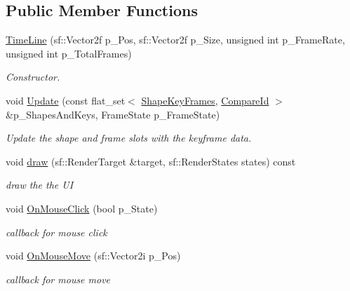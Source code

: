 \subsection*{Public Member Functions}
\begin{DoxyCompactItemize}
\item 
\mbox{\label{class_time_line_a48cda2f285f06a06211724178d01383d}} 
\hyperlink{class_time_line_a48cda2f285f06a06211724178d01383d}{Time\+Line} (sf\+::\+Vector2f p\+\_\+\+Pos, sf\+::\+Vector2f p\+\_\+\+Size, unsigned int p\+\_\+\+Frame\+Rate, unsigned int p\+\_\+\+Total\+Frames)
\begin{DoxyCompactList}\small\item\em Constructor. \end{DoxyCompactList}\item 
\mbox{\label{class_time_line_abd8b8a4340ad3dda404a7b48d5b1e0f9}} 
void \hyperlink{class_time_line_abd8b8a4340ad3dda404a7b48d5b1e0f9}{Update} (const flat\+\_\+set$<$ \hyperlink{struct_shape_key_frames}{Shape\+Key\+Frames}, \hyperlink{struct_compare_id}{Compare\+Id} $>$ \&p\+\_\+\+Shapes\+And\+Keys, Frame\+State p\+\_\+\+Frame\+State)
\begin{DoxyCompactList}\small\item\em Update the shape and frame slots with the keyframe data. \end{DoxyCompactList}\item 
\mbox{\label{class_time_line_a5792226d36ccba7466e7f2986fd0702a}} 
void \hyperlink{class_time_line_a5792226d36ccba7466e7f2986fd0702a}{draw} (sf\+::\+Render\+Target \&target, sf\+::\+Render\+States states) const
\begin{DoxyCompactList}\small\item\em draw the the UI \end{DoxyCompactList}\item 
\mbox{\label{class_time_line_a280a51390bb34ebe26a434b871f81add}} 
void \hyperlink{class_time_line_a280a51390bb34ebe26a434b871f81add}{On\+Mouse\+Click} (bool p\+\_\+\+State)
\begin{DoxyCompactList}\small\item\em callback for mouse click \end{DoxyCompactList}\item 
\mbox{\label{class_time_line_a30ecec78f9815577bd56715ba697e7c6}} 
void \hyperlink{class_time_line_a30ecec78f9815577bd56715ba697e7c6}{On\+Mouse\+Move} (sf\+::\+Vector2i p\+\_\+\+Pos)
\begin{DoxyCompactList}\small\item\em callback for mouse move \end{DoxyCompactList}\end{DoxyCompactItemize}

